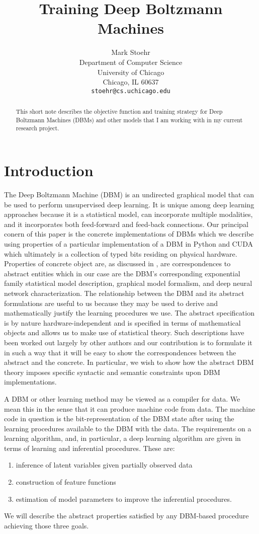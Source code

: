 \documentclass{article} %
\title{Training Deep Boltzmann Machines}
\author{
Mark Stoehr %
\\
Department of Computer Science\\
University of Chicago\\
Chicago, IL 60637 \\
\texttt{stoehr@cs.uchicago.edu} \\
}
\begin{document}
\maketitle

\begin{abstract}
This short note describes the objective function and training strategy for Deep Boltzmann Machines (DBMs)
and other models that I am working with in my current research project.
\end{abstract}

\section{Introduction}

The Deep Boltzmann Machine (DBM) is an undirected graphical model that
can be used to perform unsupervised deep learning. It is unique among deep learning approaches
because it is a statistical model, can incorporate multiple modalities, and it incorporates both feed-forward
and feed-back connections. Our principal conern of this paper is the concrete implementations of DBMs which we describe using properties of a particular
implementation of a DBM in Python and CUDA which ultimately is a collection of typed bits residing on physical hardware.  
Properties of concrete object are, as discussed in \cite[Chapter~1]{stepanov2009elements},
are correspondences
to abstract entities which in our case are the DBM's corresponding exponential family statistical
model description, graphical model formalism, and deep neural network characterization. The relationship between the DBM and its abstract
formulations are useful to us because 
they may be used to derive and mathematically justify the learning procedures we use.  The abstract 
specification is by nature hardware-independent and is specified in terms of mathematical objects and allows us to make use of 
statistical theory. Such descriptions have been worked out largely by other authors and our contribution is to formulate it
in such a way that it will be easy to show the correspondences between the abstract and the concrete.  In particular, we wish to show
how the abstract DBM theory imposes specific syntactic and semantic constraints upon DBM implementations. 

A DBM or other learning method may be viewed as a compiler for data.
We mean this in the sense that it can produce machine code from data.
The machine code in question is the bit-representation of the DBM
state after using the learning procedures available to the DBM with
the data.  The requirements on a learning algorithm, and, in
particular, a deep learning algorithm are given in terms of learning
and inferential procedures. These are:
\begin{enumerate}
\item inference of latent variables given partially
observed data 
\item construction of feature functions
\item estimation of model parameters to improve the inferential
  procedures.
\end{enumerate}  
We will describe the abstract properties satisfied by any DBM-based
procedure achieving those three goals. 
\end{document}
